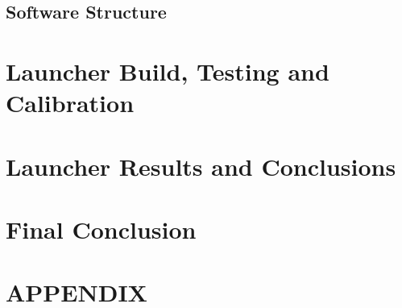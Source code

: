   \subsection{Software Structure}
  \label{sub:Software Structure}


\clearpage
\section{Launcher Build, Testing and Calibration}
\label{sec:Launcher Build, Testing and Calibration}

\clearpage
\section{Launcher Results and Conclusions}
\label{sec:Launcher Results and Conclusions}

\clearpage
\section{Final Conclusion}
\label{sec:Final Conclusion}

\clearpage
\printbibliography


\clearpage
\section{APPENDIX}
\label{sec:APPENDIX}




